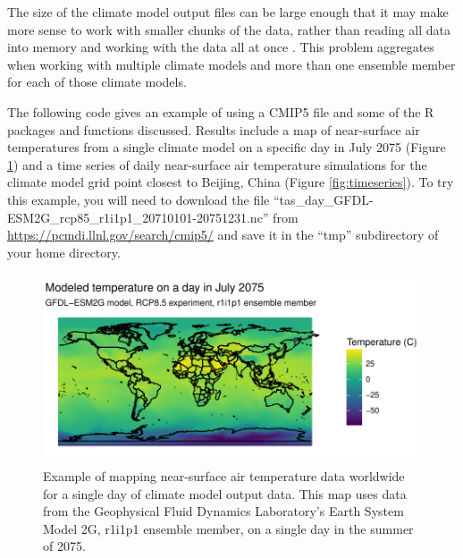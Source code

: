 The size of the climate model output files can be large enough that it
may make more sense to work with smaller chunks of the data, rather than
reading all data into memory and working with the data all at once
\citep{RCMIP5}. This problem aggregates when working with multiple
climate models and more than one ensemble member for each of those
climate models.

The following code gives an example of using a CMIP5 file and some of
the R packages and functions discussed. Results include a map of
near-surface air temperatures from a single climate model on a specific
day in July 2075 (Figure \ref{fig:worldmap}) and a time series of daily
near-surface air temperature simulations for the climate model grid
point closest to Beijing, China (Figure \ref{fig:timeseries}). To try
this example, you will need to download the file
``tas\_day\_GFDL-ESM2G\_rcp85\_r1i1p1\_20710101-20751231.nc'' from
\url{https://pcmdi.llnl.gov/search/cmip5/} and save it in the ``tmp''
subdirectory of your home directory.

\begin{figure}
\begin{center}
\includegraphics[width = \textwidth]{worldmapexample}
\end{center}
\caption{Example of mapping near-surface air temperature data worldwide for a single day of climate model output data. This map uses data from the Geophysical Fluid Dynamics Laboratory's Earth System Model 2G, r1i1p1 ensemble member, on a single day in the summer of 2075.}
\label{fig:worldmap}
\end{figure}

